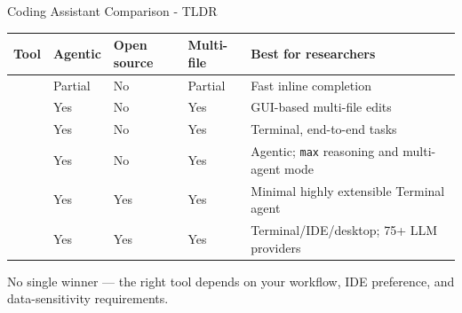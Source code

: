\begin{frame}{Coding Assistant Comparison - TLDR}
  \small
  \begin{tabularx}{\textwidth}{lYYYY}
    \toprule
    \textbf{Tool} & \textbf{Agentic} & \textbf{Open source} & \textbf{Multi-file} & \textbf{Best for researchers} \\
    \midrule
                 & Partial & No  & Partial & Fast inline completion \\
                  & Yes     & No  & Yes     & GUI-based multi-file edits \\
             & Yes     & No  & Yes     & Terminal, end-to-end tasks \\
             & Yes     & No  & Yes     & Agentic; \texttt{max} reasoning and multi-agent mode \\
                      & Yes     & Yes & Yes     & Minimal highly extensible Terminal agent\\
                & Yes     & Yes & Yes     & Terminal/IDE/desktop; 75+ LLM providers \\
    \bottomrule
  \end{tabularx}
  \vspace{0.5em}
  \small \alert{No single winner} — the right tool depends on your workflow, IDE preference, and data-sensitivity requirements.
\end{frame}

